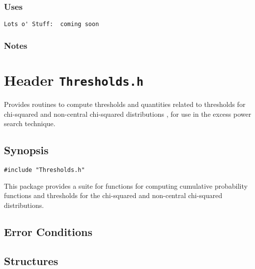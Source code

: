 \subsubsection*{Uses}
\begin{verbatim}
Lots o' Stuff:  coming soon
\end{verbatim}
\subsubsection*{Notes}

\vfill{\footnotesize}



%
%
%
%
%
%
%
%




\newpage
\section{Header \texttt{Thresholds.h}}
\label{s:Thresholds.h}

\noindent Provides routines to compute thresholds and quantities related to
thresholds for chi-squared and non-central chi-squared distributions
\cite{ptvf:1992}, for use in the excess power search technique.

\subsection*{Synopsis}
\begin{verbatim}
#include "Thresholds.h"
\end{verbatim}

\noindent This package provides a suite for functions for computing cumulative
probability functions and thresholds for the chi-squared and non-central
chi-squared distributions.

\subsection*{Error Conditions}


\subsection*{Structures}

